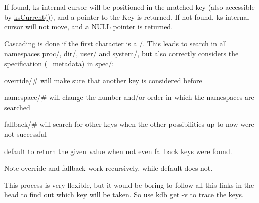 If found, {\ttfamily ks} internal cursor will be positioned in the matched key (also accessible by \hyperlink{group__keyset_ga4287b9416912c5f2ab9c195cb74fb094}{ks\+Current()}), and a pointer to the Key is returned. If not found, {\ttfamily ks} internal cursor will not move, and a N\+U\+L\+L pointer is returned.

Cascading is done if the first character is a /. This leads to search in all namespaces proc/, dir/, user/ and system/, but also correctly considers the specification (=metadata) in spec/\+:


\begin{DoxyItemize}
\item {\ttfamily override/\#} will make sure that another key is considered before
\item {\ttfamily namespace/\#} will change the number and/or order in which the namespaces are searched
\item {\ttfamily fallback/\#} will search for other keys when the other possibilities up to now were not successful
\item {\ttfamily default} to return the given value when not even {\ttfamily fallback} keys were found.
\end{DoxyItemize}

\begin{DoxyNote}{Note}
override and fallback work recursively, while default does not.
\end{DoxyNote}
This process is very flexible, but it would be boring to follow all this links in the head to find out which key will be taken. So use {\ttfamily kdb get -\/v} to trace the keys.

